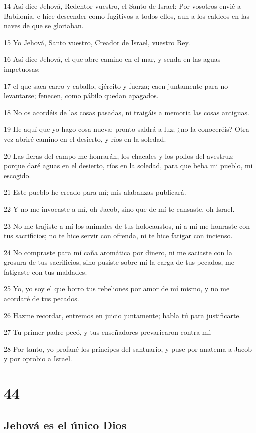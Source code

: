 \par 14 Así dice Jehová, Redentor vuestro, el Santo de Israel: Por vosotros envié a Babilonia, e hice descender como fugitivos a todos ellos, aun a los caldeos en las naves de que se gloriaban.
\par 15 Yo Jehová, Santo vuestro, Creador de Israel, vuestro Rey.
\par 16 Así dice Jehová, el que abre camino en el mar, y senda en las aguas impetuosas;
\par 17 el que saca carro y caballo, ejército y fuerza; caen juntamente para no levantarse; fenecen, como pábilo quedan apagados.
\par 18 No os acordéis de las cosas pasadas, ni traigáis a memoria las cosas antiguas.
\par 19 He aquí que yo hago cosa nueva; pronto saldrá a luz; ¿no la conoceréis? Otra vez abriré camino en el desierto, y ríos en la soledad.
\par 20 Las fieras del campo me honrarán, los chacales y los pollos del avestruz; porque daré aguas en el desierto, ríos en la soledad, para que beba mi pueblo, mi escogido.
\par 21 Este pueblo he creado para mí; mis alabanzas publicará.
\par 22 Y no me invocaste a mí, oh Jacob, sino que de mí te cansaste, oh Israel.
\par 23 No me trajiste a mí los animales de tus holocaustos, ni a mí me honraste con tus sacrificios; no te hice servir con ofrenda, ni te hice fatigar con incienso.
\par 24 No compraste para mí caña aromática por dinero, ni me saciaste con la grosura de tus sacrificios, sino pusiste sobre mí la carga de tus pecados, me fatigaste con tus maldades.
\par 25 Yo, yo soy el que borro tus rebeliones por amor de mí mismo, y no me acordaré de tus pecados.
\par 26 Hazme recordar, entremos en juicio juntamente; habla tú para justificarte.
\par 27 Tu primer padre pecó, y tus enseñadores prevaricaron contra mí.
\par 28 Por tanto, yo profané los príncipes del santuario, y puse por anatema a Jacob y por oprobio a Israel.

\chapter{44}

\section*{Jehová es el único Dios}

